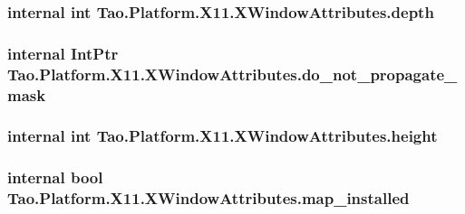 \label{struct_tao_1_1_platform_1_1_x11_1_1_x_window_attributes_a5636bba1d646bf1fdacba573b65174b9}
\hypertarget{struct_tao_1_1_platform_1_1_x11_1_1_x_window_attributes_a406f5f15955ae38fb0c6bde18ea4c41b}{
\subsubsection[{depth}]{\setlength{\rightskip}{0pt plus 5cm}internal int {\bf Tao.Platform.X11.XWindowAttributes.depth}}}
\label{struct_tao_1_1_platform_1_1_x11_1_1_x_window_attributes_a406f5f15955ae38fb0c6bde18ea4c41b}
\hypertarget{struct_tao_1_1_platform_1_1_x11_1_1_x_window_attributes_ad0b2e99569ea5ebd80007b979dc021eb}{
\subsubsection[{do\_\-not\_\-propagate\_\-mask}]{\setlength{\rightskip}{0pt plus 5cm}internal IntPtr {\bf Tao.Platform.X11.XWindowAttributes.do\_\-not\_\-propagate\_\-mask}}}
\label{struct_tao_1_1_platform_1_1_x11_1_1_x_window_attributes_ad0b2e99569ea5ebd80007b979dc021eb}
\hypertarget{struct_tao_1_1_platform_1_1_x11_1_1_x_window_attributes_a87fe8ee8693cb7428a24a75f5667cd3b}{
\subsubsection[{height}]{\setlength{\rightskip}{0pt plus 5cm}internal int {\bf Tao.Platform.X11.XWindowAttributes.height}}}
\label{struct_tao_1_1_platform_1_1_x11_1_1_x_window_attributes_a87fe8ee8693cb7428a24a75f5667cd3b}
\hypertarget{struct_tao_1_1_platform_1_1_x11_1_1_x_window_attributes_a37d4be26b8f7ae394bf354452ce19007}{
\subsubsection[{map\_\-installed}]{\setlength{\rightskip}{0pt plus 5cm}internal bool {\bf Tao.Platform.X11.XWindowAttributes.map\_\-installed}}}
